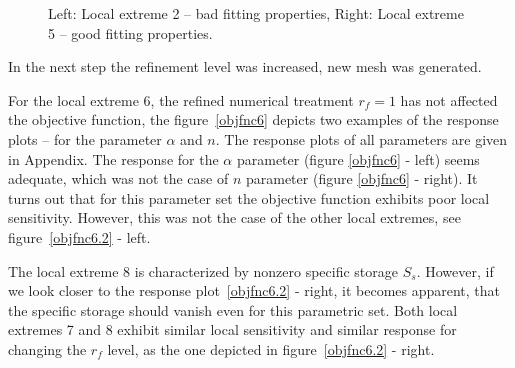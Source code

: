 \documentclass[review,times,3p,twocolumn,10pt]{elsarticle}
\begin{document}
\begin{figure}
\caption{Left: Local extreme 2 -- bad fitting properties, Right: Local extreme 5 -- good fitting properties.}
\label{rf0samples}
\end{figure}

In the next step the refinement level was increased, new mesh was generated.

For the local extreme 6, the refined numerical treatment $r_f=1$ has not affected the objective function, the figure~\ref{objfnc6} depicts two examples of the response plots -- for the parameter $\alpha$ and $n$. The response plots of all parameters are given in Appendix. The response for the $\alpha$ parameter (figure \ref{objfnc6} - left) seems adequate, which was not the case of $n$ parameter  (figure \ref{objfnc6} - right). It turns out that for this parameter set the objective function exhibits poor local sensitivity. However, this was not the case of the other local extremes, see figure~\ref{objfnc6.2} - left. 

The local extreme 8 is characterized by nonzero specific storage $S_s$. However, if we look closer to the response plot~\ref{objfnc6.2} - right, it becomes apparent, that the specific storage should vanish even for this parametric set. Both local extremes 7 and 8 exhibit similar local sensitivity and similar response for changing the $r_f$ level, as the one depicted in figure~\ref{objfnc6.2} - right.
\end{document}
